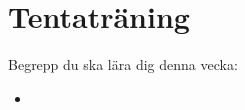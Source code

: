\chapter{Tentaträning}\label{chapter:W14}
Begrepp du ska lära dig denna vecka:
\begin{itemize}[noitemsep,label={$\square$},leftmargin=*]
\item\end{itemize}
